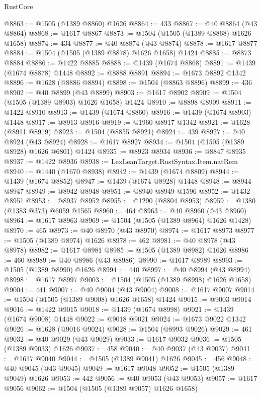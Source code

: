 \begin{lexlean}{RustCore}
\begin{coremodule}
@8863 := @1505 (@1389 @8860) @1626
@8864 := 433
@8867 := @40 @8864 (@43 @8864)
@8868 := @1617 @8867
@8873 := @1504 (@1505 (@1389 @8868) @1626 @1658)
@8874 := 434
@8877 := @40 @8874 (@43 @8874)
@8878 := @1617 @8877
@8884 := @1504 (@1505 (@1389 @8878) @1626 @1658) @1424
@8885 := @8873 @8884
@8886 := @1422 @8885
@8888 := @1439 (@1674 @8868)
@8891 := @1439 (@1674 @8878) @1448
@8892 := @8888 @8891
@8894 := @1673 @8892 @1342
@8896 := @1628 (@8886 @8894)
@8898 := @1504 (@8863 @8896)
@8899 := 436
@8902 := @40 @8899 (@43 @8899)
@8903 := @1617 @8902
@8909 := @1504 (@1505 (@1389 @8903) @1626 @1658) @1424
@8910 := @8898 @8909
@8911 := @1422 @8910
@8913 := @1439 (@1674 @8860)
@8916 := @1439 (@1674 @8903) @1448
@8917 := @8913 @8916
@8919 := @1960 @8917 @1342
@8921 := @1628 (@8911 @8919)
@8923 := @1504 (@8855 @8921)
@8924 := 439
@8927 := @40 @8924 (@43 @8924)
@8928 := @1617 @8927
@8934 := @1504 (@1505 (@1389 @8928) @1626 @6801) @1424
@8935 := @8923 @8934
@8936 := @8847 @8935
@8937 := @1422 @8936
@8938 := LexLeanTarget.RustSyntax.Item.natRem
@8940 := @1440 (@1670 @8938)
@8942 := @1439 (@1674 @8809)
@8944 := @1439 (@1674 @8852)
@8947 := @1439 (@1674 @8928) @1448
@8948 := @8944 @8947
@8949 := @8942 @8948
@8951 := @8940 @8949 @1596
@8952 := @1432 @8951
@8953 := @8937 @8952
@8955 := @1290 (@8804 @8953)
@8959 := @1380 (@1383 @373) @6059 @1565
@8960 := 464
@8963 := @40 @8960 (@43 @8960)
@8964 := @1617 @8963
@8969 := @1504 (@1505 (@1389 @8964) @1626 @1428)
@8970 := 465
@8973 := @40 @8970 (@43 @8970)
@8974 := @1617 @8973
@8977 := @1505 (@1389 @8974) @1626
@8978 := 462
@8981 := @40 @8978 (@43 @8978)
@8982 := @1617 @8981
@8985 := @1505 (@1389 @8982) @1626
@8986 := 460
@8989 := @40 @8986 (@43 @8986)
@8990 := @1617 @8989
@8993 := @1505 (@1389 @8990) @1626
@8994 := 440
@8997 := @40 @8994 (@43 @8994)
@8998 := @1617 @8997
@9003 := @1504 (@1505 (@1389 @8998) @1626 @1658)
@9004 := 441
@9007 := @40 @9004 (@43 @9004)
@9008 := @1617 @9007
@9014 := @1504 (@1505 (@1389 @9008) @1626 @1658) @1424
@9015 := @9003 @9014
@9016 := @1422 @9015
@9018 := @1439 (@1674 @8998)
@9021 := @1439 (@1674 @9008) @1448
@9022 := @9018 @9021
@9024 := @1673 @9022 @1342
@9026 := @1628 (@9016 @9024)
@9028 := @1504 (@8993 @9026)
@9029 := 461
@9032 := @40 @9029 (@43 @9029)
@9033 := @1617 @9032
@9036 := @1505 (@1389 @9033) @1626
@9037 := 458
@9040 := @40 @9037 (@43 @9037)
@9041 := @1617 @9040
@9044 := @1505 (@1389 @9041) @1626
@9045 := 456
@9048 := @40 @9045 (@43 @9045)
@9049 := @1617 @9048
@9052 := @1505 (@1389 @9049) @1626
@9053 := 442
@9056 := @40 @9053 (@43 @9053)
@9057 := @1617 @9056
@9062 := @1504 (@1505 (@1389 @9057) @1626 @1658)

\end{coremodule}
\end{lexlean}
